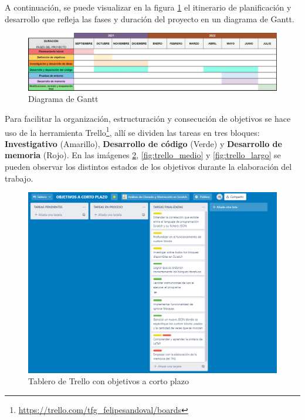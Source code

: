 \documentclass[a4paper, 12pt]{book}
\begin{document}
A continuación, se puede visualizar en la figura \ref{fig:diagrama_gantt} el itinerario de planificación y desarrollo que refleja las fases y duración del proyecto en un diagrama de Gantt.

\begin{figure}[htb!]
	\centering
    \includegraphics[width=17cm, keepaspectratio]{img/gantt.jpg}
    \caption{Diagrama de Gantt}
    \label{fig:diagrama_gantt}
\end{figure}

\pagebreak 
Para facilitar la organización, estructuración y consecución de objetivos se hace uso de la herramienta Trello\footnote{\url{https://trello.com/tfg_felipesandoval/boards}}, allí se dividen las tareas en tres bloques: \textbf{Investigativo} (Amarillo), \textbf{Desarrollo de código} (Verde) y \textbf{Desarrollo de memoria} (Rojo). En las imágenes \ref{fig:trello_corto}, \ref{fig:trello_medio} y \ref{fig:trello_largo} se pueden observar los distintos estados de los objetivos durante la elaboración del trabajo.

 \begin{figure}[h]
 	 \centering
    \includegraphics[width=15cm, keepaspectratio]{img/obj_cortoplazo.png}
    \caption{Tablero de Trello con objetivos a corto plazo}
    \label{fig:trello_corto}
 \end{figure}
\end{document}
